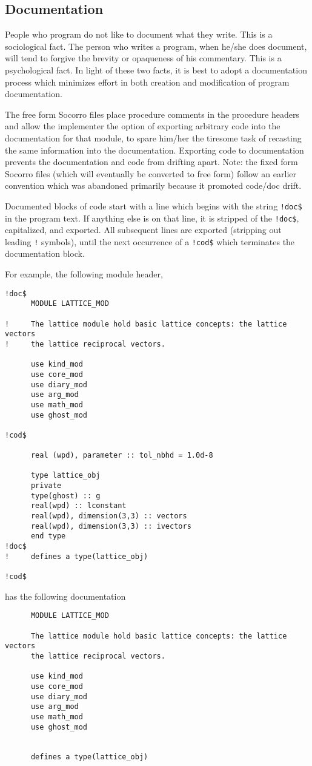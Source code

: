 \subsection{Documentation}

People who program do not like to document what they write.
This is a sociological fact.  The person who writes a program,
when he/she does document, will tend to forgive the brevity
or opaqueness of his commentary.  This is a psychological fact.
In light of these two facts, it is best to adopt a documentation
process which minimizes effort in both creation and modification
of program documentation.

The free form Socorro files place procedure comments in the
procedure headers and allow the implementer the option of exporting
arbitrary code into the documentation for that module, to spare
him/her the tiresome task of recasting the same information into
the documentation.  Exporting code to documentation
prevents the documentation and code
from drifting apart.  Note: the fixed form Socorro files (which
will eventually be converted to free form) follow
an earlier convention which was abandoned primarily because
it promoted code/doc drift.

Documented blocks of code start with a line which begins with the
string \verb+!doc$+ in the program text.  If anything else is on that
line, it is stripped of the \verb+!doc$+, capitalized, and exported.
All subsequent lines are exported (stripping out leading \verb+!+
symbols), until the next occurrence of a \verb+!cod$+ which terminates
the documentation block.

For example, the following module header,
\begin{verbatim}
!doc$
      MODULE LATTICE_MOD

!     The lattice module hold basic lattice concepts: the lattice vectors
!     the lattice reciprocal vectors.

      use kind_mod
      use core_mod
      use diary_mod
      use arg_mod
      use math_mod
      use ghost_mod

!cod$

      real (wpd), parameter :: tol_nbhd = 1.0d-8

      type lattice_obj
      private
      type(ghost) :: g
      real(wpd) :: lconstant
      real(wpd), dimension(3,3) :: vectors
      real(wpd), dimension(3,3) :: ivectors
      end type
!doc$ 
!     defines a type(lattice_obj)

!cod$     
\end{verbatim}
has the following documentation 
\begin{verbatim}
      MODULE LATTICE_MOD

      The lattice module hold basic lattice concepts: the lattice vectors
      the lattice reciprocal vectors.

      use kind_mod
      use core_mod
      use diary_mod
      use arg_mod
      use math_mod
      use ghost_mod


      defines a type(lattice_obj)

\end{verbatim}

